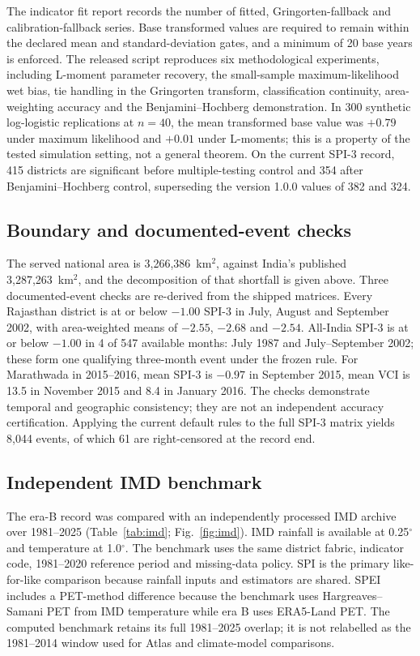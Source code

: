\documentclass[10pt,a4paper]{article}
\begin{document}
The indicator fit report records the number of fitted, Gringorten-fallback and calibration-fallback series. Base transformed values are required to remain within the declared mean and standard-deviation gates, and a minimum of 20 base years is enforced. The released  script reproduces six methodological experiments, including L-moment parameter recovery, the small-sample maximum-likelihood wet bias, tie handling in the Gringorten transform, classification continuity, area-weighting accuracy and the Benjamini--Hochberg demonstration. In 300 synthetic log-logistic replications at $n=40$, the mean transformed base value was $+0.79$ under maximum likelihood and $+0.01$ under L-moments; this is a property of the tested simulation setting, not a general theorem. On the current SPI-3 record, 415 districts are significant before multiple-testing control and 354 after Benjamini--Hochberg control, superseding the version 1.0.0 values of 382 and 324.

\subsection*{Boundary and documented-event checks}
The served national area is 3,266,386~km$^2$, against India's published 3,287,263~km$^2$, and the decomposition of that shortfall is given above. Three documented-event checks are re-derived from the shipped matrices. Every Rajasthan district is at or below $-1.00$ SPI-3 in July, August and September 2002, with area-weighted means of $-2.55$, $-2.68$ and $-2.54$. All-India SPI-3 is at or below $-1.00$ in 4 of 547 available months: July 1987 and July--September 2002; these form one qualifying three-month event under the frozen rule. For Marathwada in 2015--2016, mean SPI-3 is $-0.97$ in September 2015, mean VCI is 13.5 in November 2015 and 8.4 in January 2016. The checks demonstrate temporal and geographic consistency; they are not an independent accuracy certification. Applying the current default rules to the full SPI-3 matrix yields 8,044 events, of which 61 are right-censored at the record end.

\subsection*{Independent IMD benchmark}
The era-B record was compared with an independently processed IMD archive over 1981--2025 (Table~\ref{tab:imd}; Fig.~\ref{fig:imd}). IMD rainfall is available at 0.25$^\circ$ and temperature at 1.0$^\circ$. The benchmark uses the same district fabric, indicator code, 1981--2020 reference period and missing-data policy. SPI is the primary like-for-like comparison because rainfall inputs and estimators are shared. SPEI includes a PET-method difference because the benchmark uses Hargreaves--Samani PET from IMD temperature while era B uses ERA5-Land PET. The computed benchmark retains its full 1981--2025 overlap; it is not relabelled as the 1981--2014 window used for Atlas and climate-model comparisons.
\end{document}
